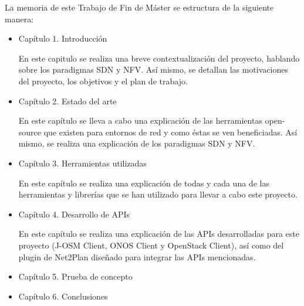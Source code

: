 La memoria de este Trabajo de Fin de Máster se estructura de la siguiente manera:
\begin{itemize}
	
	\item Capítulo 1. Introducción
	
	En este capitulo se realiza una breve contextualización del proyecto, hablando sobre los paradigmas SDN y NFV. Así mismo, se detallan las motivaciones del proyecto, los objetivos y el plan de trabajo.
	
	\item Capítulo 2. Estado del arte
	
	En este capítulo se lleva a cabo una explicación de las herramientas open-source que existen para entornos de red y como éstas se ven beneficiadas. Así mismo, se realiza una explicación de los paradigmas SDN y NFV.
	
	\item Capítulo 3. Herramientas utilizadas
	
	En este capítulo se realiza una explicación de todas y cada una de las herramientas y librerías que se han utilizado para llevar a cabo este proyecto.
	
	\item Capítulo 4. Desarrollo de APIs
	
	En este capítulo se realiza una explicación de las APIs desarrolladas para este proyecto (J-OSM Client, ONOS Client y OpenStack Client), así como del plugin de Net2Plan diseñado para integrar las APIs mencionadas.
	
	\item Capítulo 5. Prueba de concepto
	
	
	\item Capítulo 6. Conclusiones
	
	
\end{itemize}
\cleardoublepage
	
